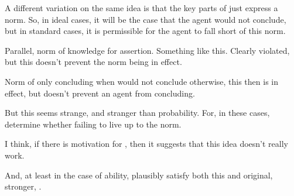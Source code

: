 \begin{note}
  A different variation on the same idea is that the key parts of \zS{} just express a norm.
  So, in ideal cases, it will be the case that the agent would not conclude, but in standard cases, it is permissible for the agent to fall short of this norm.

  Parallel, norm of knowledge for assertion.
  Something like this.
  Clearly violated, but this doesn't prevent the norm being in effect.

  Norm of only concluding when would not conclude otherwise, this then is in effect, but doesn't prevent an agent from concluding.

  But this seems strange, and stranger than probability.
  For, in these cases, determine whether failing to live up to the norm.

  I think, if there is motivation for \zS{}, then it suggests that this idea doesn't really work.

  And, at least in the case of ability, plausibly satisfy both this and original, stronger, \qzS{}.
\end{note}

